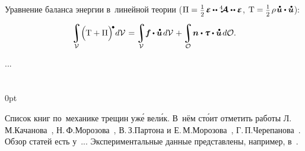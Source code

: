 \begin{otherlanguage}{russian}

Уравнение баланса энергии в~линейной теории (${\Pi = \smash{\smalldisplaystyleonehalf} \hspace{.25ex} \mathboldepsilon \hspace{-0.1ex} \dotdotp \stiffnesstensor \dotdotp \mathboldepsilon}$, ${\mathrm{T} = \smash{\smalldisplaystyleonehalf} \hspace{.25ex} \rho \hspace{.2ex} \mathdotabove{\bm{u}} \dotp \mathdotabove{\bm{u}}}$):

\nopagebreak\vspace{-0.1em}\begin{equation}
\integral\displaylimits_{\mathcal{V}} \hspace{-0.42ex} \left(^{\mathstrut} \hspace{-0.2ex} \mathrm{T} + \Pi \right)^{\hspace{-0.12em}\tikz[baseline=-0.2ex] \draw[black, fill=black] (0,0) circle (.28ex);} \hspace{-0.25ex} d\mathcal{V} \hspace{.2ex}
= \hspace{-0.1ex}
\integral\displaylimits_{\mathcal{V}} \hspace{-0.5ex} \bm{f} \hspace{-0.1ex} \dotp \mathdotabove{\bm{u}} \hspace{.25ex} d\mathcal{V} \hspace{.16ex}
+ \hspace{-0.1ex}
\integral\displaylimits_{\mathcal{O}} \hspace{-0.32ex} \bm{n} \dotp \mathboldtau \dotp \mathdotabove{\bm{u}} \hspace{.25ex} d\mathcal{O}.
\end{equation}

...



\end{otherlanguage}

\section*{\small \wordforbibliography}

\begin{changemargin}{\parindent}{0pt}
\fontsize{10}{12}\selectfont

\begin{otherlanguage}{russian}

Список книг по~механике трещин уж\'{е} вел\'{и}к. В~нём ст\'{о}ит отметить работы Л.\,М.\;Качанова~\cite{kachanov-fracturemechanics}, Н.\,Ф.\;Морозова~\cite{morozov-fractures}, В.\,З.\;Партона и Е.\,М.\;Морозова~\cite{parton.morozov-destructionofelastoplastic}, Г.\,П.\;Черепанова~\cite{cherepanov-fragilefracture}. Обзор статей есть у~... Экспериментальные данные представлены, например, в~\cite{kerstein.klyushnikov.lomakin.shesterikov-experimentalfracturemechanics}.

\end{otherlanguage}

\end{changemargin}

